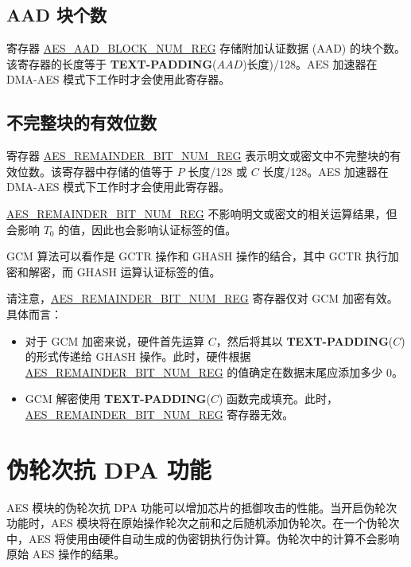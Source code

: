 \documentclass[main\_\_CN.tex]{subfiles}
\begin{document}
\subsection{AAD 块个数}\label{sec:aes-aad-block-number}

寄存器 \hyperref[regdesc:AESAADBLOCKNUMREG]{AES\_AAD\_BLOCK\_NUM\_REG} 存储附加认证数据 (AAD) 的块个数。该寄存器的长度等于 {\bfseries TEXT-PADDING}($AAD$)长度)/128。AES 加速器在 DMA-AES 模式下工作时才会使用此寄存器。


\subsection{不完整块的有效位数}\label{sec:aes-remainder-bit-number}


寄存器 \hyperref[regdesc:AESREMAINDERBITNUMREG]{AES\_REMAINDER\_BIT\_NUM\_REG} 表示明文或密文中不完整块的有效位数。该寄存器中存储的值等于 $P$ 长度/128 或 $C$ 长度/128。AES 加速器在 DMA-AES 模式下工作时才会使用此寄存器。

\hyperref[regdesc:AESREMAINDERBITNUMREG]{AES\_REMAINDER\_BIT\_NUM\_REG} 不影响明文或密文的相关运算结果，但会影响 $T_{0}$ 的值，因此也会影响认证标签的值。

GCM 算法可以看作是 GCTR 操作和 GHASH 操作的结合，其中 GCTR 执行加密和解密，而 GHASH 运算认证标签的值。

请注意，\hyperref[regdesc:AESREMAINDERBITNUMREG]{AES\_REMAINDER\_BIT\_NUM\_REG} 寄存器仅对 GCM 加密有效。具体而言：

\begin{itemize}
    \item 对于 GCM 加密来说，硬件首先运算 $C$，然后将其以 {\bfseries TEXT-PADDING}($C$) 的形式传递给 GHASH 操作。此时，硬件根据 \hyperref[regdesc:AESREMAINDERBITNUMREG]{AES\_REMAINDER\_BIT\_NUM\_REG} 的值确定在数据末尾应添加多少 0。
    \item GCM 解密使用 {\bfseries TEXT-PADDING}($C$) 函数完成填充。此时，\hyperref[regdesc:AESREMAINDERBITNUMREG]{AES\_REMAINDER\_BIT\_NUM\_REG} 寄存器无效。
\end{itemize}


\section{伪轮次抗 DPA 功能}

\chipname{} AES 模块的伪轮次抗 DPA 功能可以增加芯片的抵御攻击的性能。当开启伪轮次功能时，AES 模块将在原始操作轮次之前和之后随机添加伪轮次。在一个伪轮次中，AES 将使用由硬件自动生成的伪密钥执行伪计算。伪轮次中的计算不会影响原始 AES 操作的结果。
\end{document}
